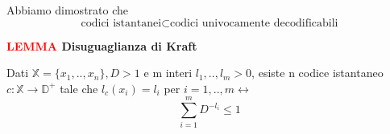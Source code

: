 \documentclass[12pt]{report}
\begin{document}
    \noindent
    Abbiamo dimostrato che $$\text{codici istantanei} \subset \text{codici univocamente decodificabili}$$


    \vspace{5px}
    \begin{tcolorbox}
        \textbf{\textcolor{red}{LEMMA} Disuguaglianza di Kraft}
        \begin{center}
            Dati $ \mathbb{X} = \{x_1,..,x_n\}, D > 1$ e m interi $l_1,..,l_m > 0$, esiste n codice istantaneo $c: \mathbb{X} \rightarrow \mathbb{D}^+$ tale che $l_c(x_i) = l_i$ per $i = 1,..,m \leftrightarrow $ $$\sum_{i = 1}^m D^{-l_i} \leq 1$$
        \end{center}
    \end{tcolorbox}

    \vspace{5px}
\end{document}
